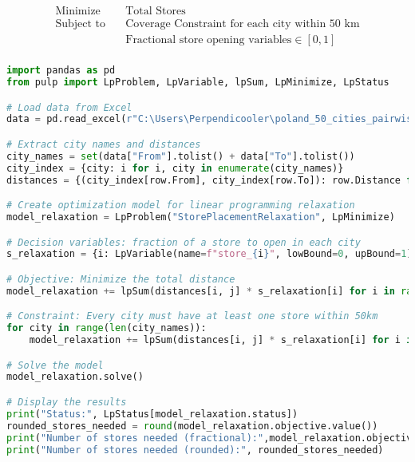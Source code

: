\begin{align*}
\text{Minimize} & \quad \text{Total Stores} \\
\text{Subject to} & \quad \text{Coverage Constraint for each city within 50 km} \\
& \quad \text{Fractional store opening variables} \in [0, 1] \\
\end{align*}
\newpage
\begin{center}
    \begin{lstlisting}[language=Python, caption=linear programming relaxation]
        import pandas as pd
from pulp import LpProblem, LpVariable, lpSum, LpMinimize, LpStatus

# Load data from Excel
data = pd.read_excel(r"C:\Users\Perpendicooler\poland_50_cities_pairwise_distances.xlsx")  # Replace with your actual file path

# Extract city names and distances
city_names = set(data["From"].tolist() + data["To"].tolist())
city_index = {city: i for i, city in enumerate(city_names)}
distances = {(city_index[row.From], city_index[row.To]): row.Distance for row in data.itertuples()}

# Create optimization model for linear programming relaxation
model_relaxation = LpProblem("StorePlacementRelaxation", LpMinimize)

# Decision variables: fraction of a store to open in each city
s_relaxation = {i: LpVariable(name=f"store_{i}", lowBound=0, upBound=1) for i in range(len(city_names))}

# Objective: Minimize the total distance
model_relaxation += lpSum(distances[i, j] * s_relaxation[i] for i in range(len(city_names)) for j in range(len(city_names)) if (i, j) in distances), "Minimize Distance"

# Constraint: Every city must have at least one store within 50km
for city in range(len(city_names)):
    model_relaxation += lpSum(distances[i, j] * s_relaxation[i] for i in range(len(city_names)) for j in range(len(city_names)) if (i, j) in distances and i != j) >= 1, f"City {city+1} Coverage"

# Solve the model
model_relaxation.solve()

# Display the results
print("Status:", LpStatus[model_relaxation.status])
rounded_stores_needed = round(model_relaxation.objective.value())
print("Number of stores needed (fractional):",model_relaxation.objective.value())
print("Number of stores needed (rounded):", rounded_stores_needed)

    \end{lstlisting}
\end{center}
\newpage
